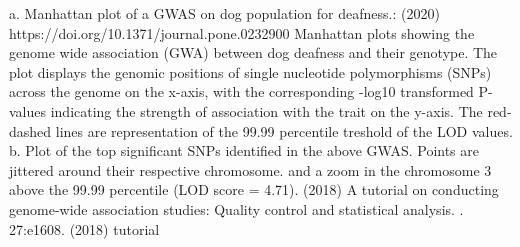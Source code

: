 {}\markdownRendererOlBeginTight
{}a. Manhattan plot of a GWAS on dog population for deafness.:  (2020) https://doi.org/10.1371/journal.pone.0232900\markdownRendererOlItemEnd 
\markdownRendererOlEndTight \markdownRendererInterblockSeparator
{}  Manhattan plots showing the genome wide association (GWA) between dog deafness and their genotype. The plot displays the genomic positions of single nucleotide polymorphisms (SNPs) across the genome on the x-axis, with the corresponding -log\markdownRendererTilde{}10\markdownRendererTilde{} transformed P-values indicating the strength of association with the trait on the y-axis. The red-dashed lines are representation of the 99.99 percentile treshold of the LOD values.\markdownRendererInterblockSeparator
{}\markdownRendererOlBeginTight
{}b. Plot of the top significant SNPs identified in the above GWAS.\markdownRendererOlItemEnd 
\markdownRendererOlEndTight \markdownRendererInterblockSeparator
{}Points are jittered around their respective chromosome.\markdownRendererInterblockSeparator
{}\markdownRendererInterblockSeparator
{}and a zoom in the chromosome 3 above the 99.99 percentile (LOD score = 4.71).\markdownRendererInterblockSeparator
{}\markdownRendererInterblockSeparator
{}
\markdownRendererSectionEnd \markdownRendererSectionBegin
{}\markdownRendererInterblockSeparator
{}\markdownRendererUlBegin
\markdownRendererUlItem {} (2018) A tutorial on conducting genome-wide association studies: Quality control and statistical analysis. . 27:e1608. \markdownRendererUlItemEnd 
\markdownRendererUlItem {} (2018) tutorial \markdownRendererUlItemEnd 
